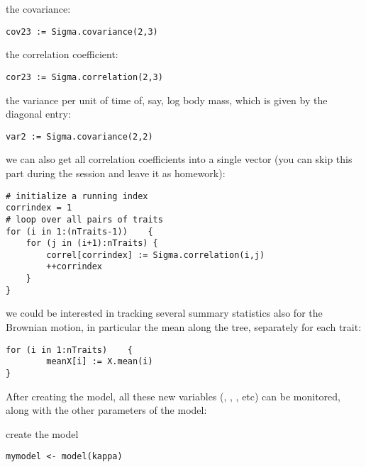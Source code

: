 the covariance:
{\tt \small \begin{snugshade*}
\begin{lstlisting}
cov23 := Sigma.covariance(2,3)
\end{lstlisting}
\end{snugshade*}}
the correlation coefficient:
{\tt \small \begin{snugshade*}
\begin{lstlisting}
cor23 := Sigma.correlation(2,3)
\end{lstlisting}
\end{snugshade*}}
the variance per unit of time of, say, log body mass, which is given by the diagonal entry:
{\tt \small \begin{snugshade*}
\begin{lstlisting}
var2 := Sigma.covariance(2,2)
\end{lstlisting}
\end{snugshade*}}
we can also get all correlation coefficients into a single vector (you can skip this part during the session and leave it as  homework):
{\tt \small \begin{snugshade*}
\begin{lstlisting}
# initialize a running index
corrindex = 1
# loop over all pairs of traits
for (i in 1:(nTraits-1))    {
    for (j in (i+1):nTraits) {
        correl[corrindex] := Sigma.correlation(i,j)
        ++corrindex
    }
}
\end{lstlisting}
\end{snugshade*}}
we could be interested in tracking several summary statistics also for the Brownian motion, in particular the mean along the tree, separately for each trait:
{\tt \small \begin{snugshade*}
\begin{lstlisting}
for (i in 1:nTraits)    {
        meanX[i] := X.mean(i)
}
\end{lstlisting}
\end{snugshade*}}

After creating the model, all these new variables (, , , etc) can be monitored, along with the other parameters of the model:

create the model
{\tt \small \begin{snugshade*}
\begin{lstlisting}
mymodel <- model(kappa)
\end{lstlisting}
\end{snugshade*}}

